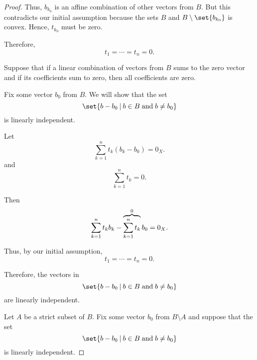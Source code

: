 \begin{proof}
  Thus, \( b_{k_0} \) is an affine combination of other vectors from \( B \). But this contradicts our initial assumption because the sets \( B \) and \( B \setminus \set{ b_{k_0} } \) is convex. Hence, \( t_{k_0} \) must be zero.

  Therefore,
  \begin{equation*}
    t_1 = \cdots = t_n = 0.
  \end{equation*}

   Suppose that if a linear combination of vectors from \( B \) sums to the zero vector and if its coefficients sum to zero, then all coefficients are zero.

  Fix some vector \( b_0 \) from \( B \). We will show that the set
  \begin{equation*}
    \set{ b - b_0 \given b \in B \T{and} b \neq b_0 }
  \end{equation*}
  is linearly independent.

  Let
  \begin{equation*}
    \sum_{k=1}^n t_k (b_k - b_0) = 0_X.
  \end{equation*}
  and
  \begin{equation*}
    \sum_{k=1}^n t_k = 0.
  \end{equation*}

  Then
  \begin{equation*}
    \sum_{k=1}^n t_k b_k - \overbrace{ \sum_{k=1}^n t_k }^{\mathclap{0}} b_0 = 0_X.
  \end{equation*}

  Thus, by our initial assumption,
  \begin{equation*}
    t_1 = \cdots = t_n = 0.
  \end{equation*}

  Therefore, the vectors in
  \begin{equation*}
    \set{ b - b_0 \given b \in B \T{and} b \neq b_0 }
  \end{equation*}
  are linearly independent.

   Let \( A \) be a strict subset of \( B \). Fix some vector \( b_0 \) from \( B \setminus A \) and suppose that the set
  \begin{equation*}
    \set{ b - b_0 \given b \in B \T{and} b \neq b_0 }
  \end{equation*}
  is linearly independent.


\end{proof}
